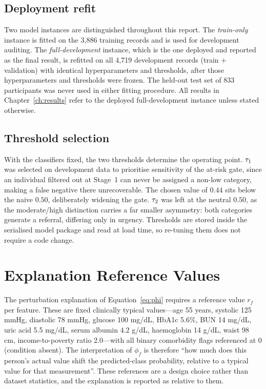 \subsection{Deployment refit}

Two model instances are distinguished throughout this report. The
\emph{train-only} instance is fitted on the 3{,}886 training records and is used
for development auditing. The \emph{full-development} instance, which is the one
deployed and reported as the final result, is refitted on all 4{,}719
development records (train $+$ validation) with identical hyperparameters and
thresholds, after those hyperparameters and thresholds were frozen. The held-out
test set of 833 participants was never used in either fitting procedure. All
results in Chapter~\ref{ch:results} refer to the deployed full-development
instance unless stated otherwise.

\subsection{Threshold selection}
\label{sec:threshold}

With the classifiers fixed, the two thresholds determine the operating point.
$\tau_{1}$ was selected on development data to prioritise sensitivity of the
at-risk gate, since an individual filtered out at Stage~1 can never be assigned
a non-low category, making a false negative there unrecoverable. The chosen
value of $0.44$ sits below the naive $0.50$, deliberately widening the gate.
$\tau_{2}$ was left at the neutral $0.50$, as the moderate/high distinction
carries a far smaller asymmetry: both categories generate a referral, differing
only in urgency. Thresholds are stored inside the serialised model package and
read at load time, so re-tuning them does not require a code change.

\section{Explanation Reference Values}
\label{sec:reference}

The perturbation explanation of Equation~\ref{eq:phi} requires a reference value
$r_f$ per feature. These are fixed clinically typical values---age 55 years,
systolic 125 mmHg, diastolic 78 mmHg, glucose 100 mg/dL, HbA1c 5.6\%, BUN
14 mg/dL, uric acid 5.5 mg/dL, serum albumin 4.2 g/dL, haemoglobin 14 g/dL,
waist 98 cm, income-to-poverty ratio 2.0---with all binary comorbidity flags
referenced at $0$ (condition absent). The interpretation of $\phi_f$ is
therefore ``how much does this person's actual value shift the predicted-class
probability, relative to a typical value for that measurement''. These
references are a design choice rather than dataset statistics, and the
explanation is reported as relative to them.

